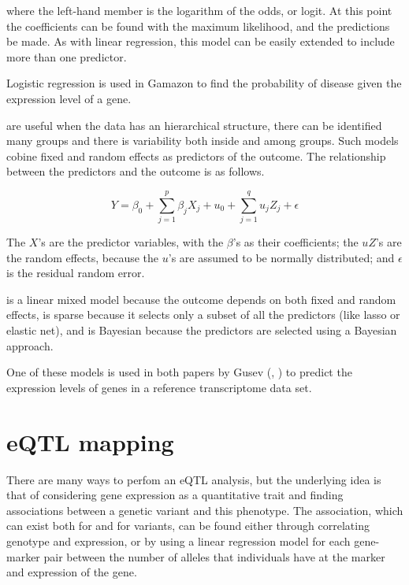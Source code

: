 \documentclass[../main.tex]{subfiles}
\begin{document}
where the left-hand member is the logarithm of the odds, or logit. At 
this point the coefficients can be found with the maximum likelihood, 
and the predictions be made. As with linear regression, this model can 
be easily extended to include more than one predictor.

Logistic regression is used in Gamazon \etal to find the probability of 
disease given the expression level of a gene.

 are useful when the data has an 
hierarchical structure, \ie there can be identified many groups and 
there is variability both inside and among groups. Such models cobine 
fixed and random effects as predictors of the outcome. The relationship 
between the predictors and the outcome is as follows.

\begin{equation}
	Y = \beta_0 + \sum_{j=1}^{p} \beta_j X_j +
		u_0 + \sum_{j=1}^{q} u_j Z_j + \epsilon
\end{equation}

The $X$'s are the predictor variables, with the $\beta$'s as their 
coefficients; the $uZ$'s are the random effects, because the $u$'s are 
assumed to be normally distributed; and $\epsilon$ is the residual 
random error.

 is a 
linear mixed model because the outcome depends on both fixed and random 
effects, is sparse because it selects only a subset of all the 
predictors (like lasso or elastic net), and is Bayesian because the 
predictors are selected using a Bayesian approach.

One of these models is used in both papers by Gusev \etal 
(, ) to predict the expression levels 
of genes in a reference transcriptome data set.

\section{eQTL mapping}

There are many ways to perfom an eQTL analysis\autocite{Gilad2008}, but the 
underlying idea is that of considering gene expression as a quantitative 
trait and finding associations between a genetic variant and this 
phenotype. The association, which can exist both for \cis and for \trans 
variants, can be found either through correlating genotype and 
expression, or by using a linear regression model for each gene-marker 
pair between the number of alleles that individuals have at the marker 
and expression of the gene.
\end{document}

